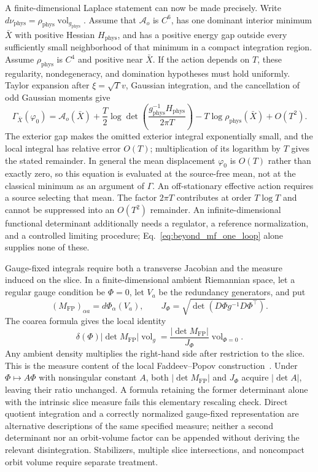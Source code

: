 A finite-dimensional Laplace statement can now be made precisely. Write
$d\nu_{\mathrm{phys}}=\rho_{\mathrm{phys}}\operatorname{vol}_{g_{\mathrm{phys}}}$.
Assume that $\mathcal A_o$ is $C^6$, has one dominant interior minimum $\bar X$ with positive Hessian $H_{\mathrm{phys}}$, and has a positive energy gap outside every sufficiently small neighborhood of that minimum in a compact integration region. Assume $\rho_{\mathrm{phys}}$ is $C^4$ and positive near $\bar X$. If the action depends on $T$, these regularity, nondegeneracy, and domination hypotheses must hold uniformly. Taylor expansion after $\xi=\sqrt T v$, Gaussian integration, and the cancellation of odd Gaussian moments give
\begin{equation}
\Gamma_{\bar X}(\varphi_0)
=\mathcal A_o(\bar X)
+\frac{T}{2}\log\det\left(
\frac{g_{\mathrm{phys}}^{-1}H_{\mathrm{phys}}}{2\pi T}\right)
-T\log\rho_{\mathrm{phys}}(\bar X)
+O(T^2).
\label{eq:beyond_mf_one_loop}
\end{equation}
The exterior gap makes the omitted exterior integral exponentially small, and the local integral has relative error $O(T)$; multiplication of its logarithm by $T$ gives the stated remainder. In general the mean displacement $\varphi_0$ is $O(T)$ rather than exactly zero, so this equation is evaluated at the source-free mean, not at the classical minimum as an argument of $\Gamma$. An off-stationary effective action requires a source selecting that mean. The factor $2\pi T$ contributes at order $T\log T$ and cannot be suppressed into an $O(T^2)$ remainder. An infinite-dimensional functional determinant additionally needs a regulator, a reference normalization, and a controlled limiting procedure; Eq.~\eqref{eq:beyond_mf_one_loop} alone supplies none of these.

Gauge-fixed integrals require both a transverse Jacobian and the measure induced on the slice. In a finite-dimensional ambient Riemannian space, let a regular gauge condition be $\Phi=0$, let $V_a$ be the redundancy generators, and put
\[
(M_{\mathrm{FP}})_{\alpha a}=d\Phi_\alpha(V_a),
\qquad
J_\Phi=\sqrt{\det(D\Phi g^{-1}D\Phi^\top)}.
\]
The coarea formula gives the local identity
\[
\delta(\Phi)|\det M_{\mathrm{FP}}|\operatorname{vol}_g
=\frac{|\det M_{\mathrm{FP}}|}{J_\Phi}
\operatorname{vol}_{\Phi=0}.
\]
Any ambient density multiplies the right-hand side after restriction to the slice. This is the measure content of the local Faddeev--Popov construction~\cite{FaddeevPopov1967}. Under $\Phi\mapsto A\Phi$ with nonsingular constant $A$, both $|\det M_{\mathrm{FP}}|$ and $J_\Phi$ acquire $|\det A|$, leaving their ratio unchanged. A formula retaining the former determinant alone with the intrinsic slice measure fails this elementary rescaling check. Direct quotient integration and a correctly normalized gauge-fixed representation are alternative descriptions of the same specified measure; neither a second determinant nor an orbit-volume factor can be appended without deriving the relevant disintegration. Stabilizers, multiple slice intersections, and noncompact orbit volume require separate treatment.


